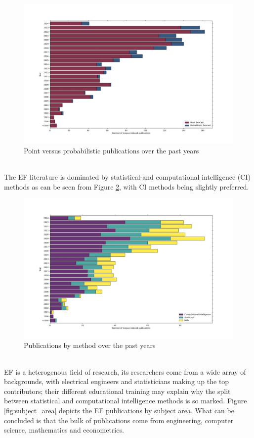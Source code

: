 \begin{figure}
  \includegraphics[width=\textwidth]{images/point_vs_prob.jpg}
  \caption{Point versus probabilistic publications over the past years}
  \label{fig:point_vs_prob}
\end{figure}
\\
The EF literature is dominated by statistical-and computational intelligence (CI) methods as can be seen from Figure \ref{fig:cs_stat_both}, with CI methods being slightly preferred. 
\begin{figure}
  \includegraphics[width=\textwidth]{images/cs_stat_both.jpg}
  \caption{Publications by method over the past years}
  \label{fig:cs_stat_both}
\end{figure}
\\
EF is a heterogenous field of research, its researchers come from a wide array of backgrounds, with electrical engineers and statisticians making up the top contributors; their different educational training may explain why the split between statistical and computational intelligence methods is so marked. Figure \ref{fig:subject_area} depicts the EF publications by subject area. What can be concluded is that the bulk of publications come from engineering, computer science, mathematics and econometrics.
